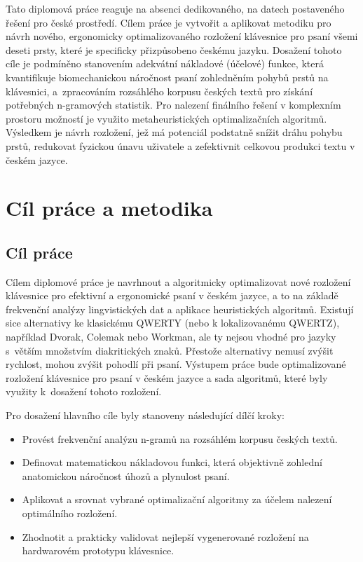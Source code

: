 \documentclass[a4paper, twoside, 12pt, czech]{article}
\begin{document}
Tato diplomová práce reaguje na absenci dedikovaného, na datech postaveného řešení 
pro české prostředí. Cílem práce je vytvořit a aplikovat metodiku pro návrh nového, 
ergonomicky optimalizovaného rozložení klávesnice pro psaní všemi deseti prsty, 
které je specificky přizpůsobeno českému jazyku. Dosažení tohoto cíle je podmíněno 
stanovením adekvátní nákladové (účelové) funkce, která kvantifikuje biomechanickou 
náročnost psaní zohledněním pohybů prstů na klávesnici, a~zpracováním rozsáhlého 
korpusu českých textů pro získání potřebných n-gramo\-vých statistik. Pro nalezení 
finálního řešení v komplexním prostoru možností je využito metaheuristických 
optimalizačních algoritmů. Výsledkem je návrh rozlo\-žení, jež má potenciál podstatně 
snížit dráhu pohybu prstů, redukovat fyzickou únavu uživatele a zefektivnit celkovou 
produkci textu v českém jazyce.
\newpage

\section{Cíl práce a metodika}
\subsection{Cíl práce}
Cílem diplomové práce je navrhnout a algoritmicky optimalizovat nové rozlo\-žení 
klávesnice pro efektivní a ergonomické psaní v českém jazyce, a to na základě 
frekvenční analýzy lingvistických dat a aplikace heuristických algoritmů. 
Existují sice alternativy ke klasickému QWERTY (nebo k lokalizovanému QWERTZ), například Dvorak, 
Colemak nebo Workman, ale ty nejsou vhodné pro jazyky s~větším množstvím 
diakritických znaků. Přestože alternativy nemusí zvýšit rychlost, mohou zvýšit 
pohodlí při psaní. Výstupem práce bude optimalizované rozlo\-žení klávesnice pro psaní 
v českém jazyce a sada algoritmů, které byly využity k~dosažení tohoto rozložení.

Pro dosažení hlavního cíle byly stanoveny následující dílčí kroky:
\begin{itemize}
    \item Provést frekvenční analýzu n-gramů na rozsáhlém korpusu českých textů.
    \item Definovat matematickou nákladovou funkci, která objektivně zohlední 
    anatomickou náročnost úhozů a plynulost psaní.
    \item Aplikovat a srovnat vybrané optimalizační algoritmy za účelem nalezení 
    optimálního rozložení.
    \item Zhodnotit a prakticky validovat nejlepší vygenerované rozložení na 
    hardwarovém prototypu klávesnice.
\end{itemize}
\end{document}
